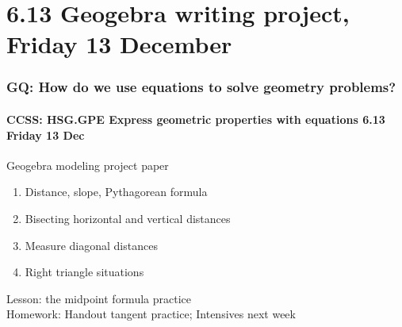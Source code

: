 \documentclass{beamer}
\begin{document}
\section{6.13 Geogebra writing project, Friday 13 December}
\frame
{
  \frametitle{GQ: How do we use equations to solve geometry problems?}
  \framesubtitle{CCSS: HSG.GPE Express geometric properties with equations \hfill \alert{6.13 Friday 13 Dec}}

  \begin{block}{Geogebra modeling project paper}
  \begin{enumerate}
    \item Distance, slope, Pythagorean formula
    \item Bisecting horizontal and vertical distances
    \item Measure diagonal distances
    \item Right triangle situations
  \end{enumerate}
  \end{block}
  Lesson: the midpoint formula practice\\
  Homework: Handout tangent practice; Intensives next week
}
\end{document}
